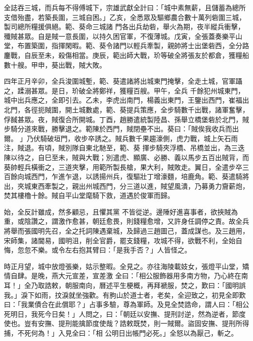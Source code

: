 \begin{pinyinscope}
 全誌吞三城，而兵每不得傅城下，宗雄武獻全計曰：「城中素無薪，且儲蓄為總所支借殆盡，若築長圍，三城自困。」乙亥，全悉眾及驅鄉農合數十萬列砦圍三城，製司總所糧援俱絕。範、葵命三城諸
 門各出兵劫砦，舉火為期，夜半縱兵衝擊，殲賊甚眾。自是賊一意長圍，以持久困官軍，不復薄城。戊寅，全張蓋奏樂平山堂，布置築圍，指揮閑暇。範、葵令諸門以輕兵牽製，親帥將士出堡砦西，全分路鏖戰，自辰至未，殺傷相當。庚辰，範出師大戰，玠等破全將張友於都倉，獲糧船數十艘。甲申，葵出戰，賊大敗。



 四年正月辛卯，全兵浚圍城塹，範、葵遣諸將出城東門掩擊，全走土城，官軍躡之，蹂溺甚眾。是日，玠破全將鄭祥，獲糧百艘。甲午，全兵
 千餘犯州城東門，城中出兵應之，全即引去。乙未，李虎出南門，楊義出東門，王鑒出西門，崔福出北門，各徑扼賊圍，開土城數處，範、葵提兵策應，全步騎數千出戰，諸軍奮擊，俘馘甚眾。夜，賊復合所開城。丁酉，趙勝遣統製陸昌、孫舉立橋堡砦於北門，賊步騎分道來戰，勝擊退之。範陳於西門，賊閉壘不出。葵曰：「賊俟我收兵而出爾。 」乃伏騎破垣門，收步卒誘之。賊兵數千果趨濠側，虎力戰，城上矢石雨注，賊退。有頃，賊別隊自東北馳至，範、葵
 揮步騎夾浮橋、吊橋並出，為三迭陳以待之，自巳至未，賊與大戰；別遣虎、顯廣、必勝、義以馬步五百出賊背，而葵帥輕兵橫衝之，三道夾擊，用範所製長槍，果大利，賊敗走。翼日，全遣步卒三百餘向城西門，乍進乍退，以誘揚州兵，復驅壯丁增濠麵，培鹿角。範、葵遣騎將出，夾城東西牽製之，親出州城西門，分三道以進，賊望風潰，乃募勇力齎薪炮，焚其樓櫓十餘。賊自平山堂麾騎下救，道遇於俊軍而歸。



 始，全反計雖成，然多顧忌，且懼其黨
 不皆從逆。邊陲好進喜事者，欲挾賊為重，或陰讚之，謂激作愈甚，朝廷愈畏，則錢糧愈增，又許身任調停之責。故全兵將舉而張國明先召，全之托詞陳遇棄城，及歸過三趙圖己，蓋成謀也。及三趙用，宋師集，諸閫易，國明沮，削全官爵，罷支錢糧，攻城不得，欲戰不利，全始自悔，忽忽不樂。或令左右抱其臂曰：「是我手否？」人皆怪之。



 時正月望，城中放燈張樂，姑示整暇。全見之。亦往海陵載妓女，張燈平山堂，矯情自肆。是晚，燕大元宣差，宣差激
 全曰：「相公服飾器用多南方物，乃心終在南耳！」全乃取誥敕，朝服南向，曆述平生梗概，再拜褫服，焚之，歎曰：「國明誤我。」淚下如雨，抆淚就坐強歡。有朐山於道士者，老矣，全迎致之，初見全即歎曰：「我業債合在此償耶？」占事多驗，尊為軍師。及見全焚誥命，謂人曰：「相公死明日，我死今日矣！」人問之，曰：「朝廷以安撫、提刑討逆，然為逆者，節度使也。豈有安撫、提刑能擒節度使哉？誥敕既焚，則一賊爾。盜固安撫、提刑所得捕，不死何為！」入見全曰：「相
 公明日出帳門必死。」全怒以為厭己，斬之。




\end{pinyinscope}
